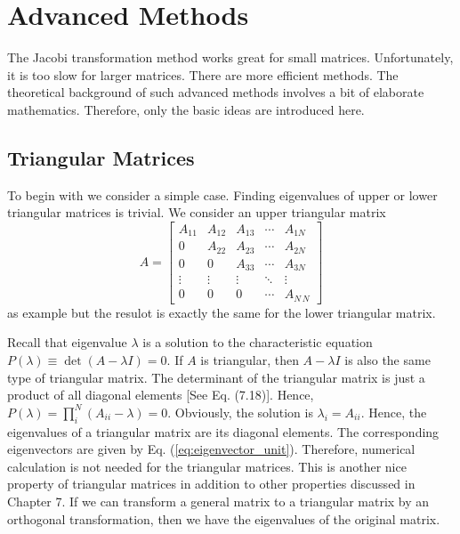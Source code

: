 {\begin{example}
\end{example}

\noindent
\section{Advanced Methods}

The Jacobi transformation method works great for small matrices.  Unfortunately, it is too slow for larger matrices.  There are more efficient methods.  The theoretical background of such advanced methods involves a bit of elaborate mathematics.   Therefore, only the basic ideas are introduced here.  

\subsection{Triangular Matrices}

To begin with we consider a simple case.  Finding eigenvalues of upper or lower triangular matrices is trivial.  We consider an upper triangular matrix
\begin{equation}
A=\begin{bmatrix}
A_{11} & A_{12} & A_{13} & \cdots & A_{1N}      \\
  0    & A_{22} & A_{23} & \cdots & A_{2N}         \\
  0    &   0    & A_{33} & \cdots & A_{3N}           \\
\vdots & \vdots & \vdots & \ddots & \vdots \\
  0    &   0    &   0    & \cdots & A_{N\,N}
\end{bmatrix}
\end{equation}
as example but the resulot is exactly the same for the lower triangular matrix.
 
Recall that eigenvalue $\lambda$ is a solution to the characteristic equation $P(\lambda)\equiv \det (A-\lambda I)=0$.
If $A$ is triangular, then $A-\lambda I$ is also the same type of triangular matrix.  The determinant of the triangular matrix is just a product of all diagonal elements [See Eq. (7.18)].  Hence, $P(\lambda)=\prod_i^N (A_{ii}-\lambda)=0$.  Obviously, the solution is $\lambda_i=A_{ii}$.  Hence, the eigenvalues of a triangular matrix are its diagonal elements.  The corresponding eigenvectors are given by Eq. (\ref{eq:eigenvector_unit}).  Therefore, numerical calculation is not needed for the triangular matrices. This is another nice property of triangular matrices in addition to other properties discussed in Chapter 7.  If we can transform a general matrix to a triangular matrix by an orthogonal transformation, then we have the eigenvalues of the original matrix.


}
